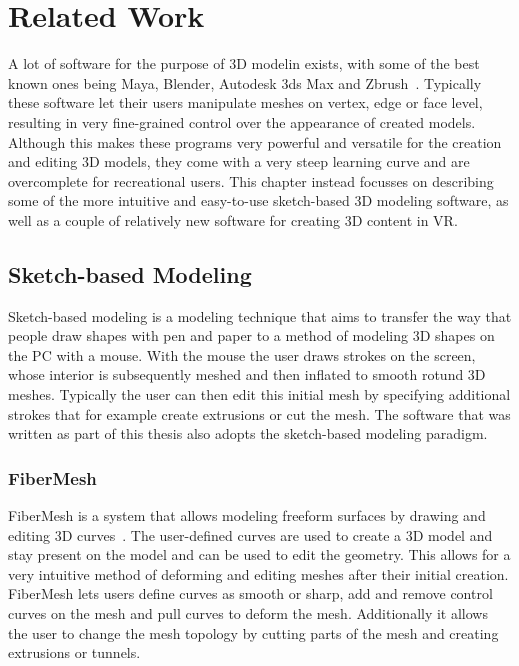 
\chapter{Related Work}
\label{chap:related}
A lot of software for the purpose of 3D modelin exists, with some of the best known ones being Maya, Blender, Autodesk 3ds Max and Zbrush~\cite{Maya, Blender, 3dsMAX, ZBrush}. Typically these software let their users manipulate meshes on vertex, edge or face level, resulting in very fine-grained control over the appearance of created models. Although this makes these programs very powerful and versatile for the creation and editing 3D models, they come with a very steep learning curve and are overcomplete for recreational users. This chapter instead focusses on describing some of the more intuitive and easy-to-use sketch-based 3D modeling software, as well as a couple of relatively new software for creating 3D content in VR. 

\section{Sketch-based Modeling}
Sketch-based modeling is a modeling technique that aims to transfer the way that people draw shapes with pen and paper to a method of modeling 3D shapes on the PC with a mouse. With the mouse the user draws strokes on the screen, whose interior is subsequently meshed and then inflated to smooth rotund 3D meshes. Typically the user can then edit this initial mesh by specifying additional strokes that for example create extrusions or cut the mesh.
The software that was written as part of this thesis also adopts the sketch-based modeling paradigm. 


\subsection{FiberMesh}
\label{subsec:fiber}
FiberMesh is a system that allows modeling freeform surfaces by drawing and editing 3D curves~\cite{Nealen2007}. The user-defined curves are used to create a 3D model and stay present on the model and can be used to edit the geometry. This allows for a very intuitive method of deforming and editing meshes after their initial creation. FiberMesh lets users define curves as smooth or sharp, add and remove control curves on the mesh and pull curves to deform the mesh. Additionally it allows the user to change the mesh topology by cutting parts of the mesh and creating extrusions or tunnels.

